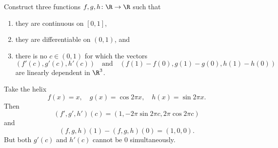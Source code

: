 \documentclass[12pt]{article}
\begin{document}
\begin{problem*}
    Construct three functions $f, g, h\colon \R \to \R$ such that
    \begin{enumerate}
        \item they are continuous on $[0, 1]$,
        \item they are differentiable on $(0, 1)$, and
        \item there is no $c \in (0, 1)$ for which the vectors \[
            (f'(c), g'(c), h'(c))
            \quad \text{and} \quad
            (f(1) - f(0), g(1) - g(0), h(1) - h(0))
        \] are linearly dependent in $\R^3$.
    \end{enumerate}
\end{problem*}
\begin{solution}
    Take the helix \[
        f(x) = x, \quad
        g(x) = \cos 2\pi x, \quad
        h(x) = \sin 2\pi x.
    \] Then \[
        (f', g', h')(c) = (1, -2\pi \sin 2\pi c, 2\pi \cos 2\pi c)
    \] and \[
        (f, g, h)(1) - (f, g, h)(0) = (1, 0, 0).
    \] But both $g'(c)$ and $h'(c)$ cannot be $0$ simultaneously.
\end{solution}
\end{document}
